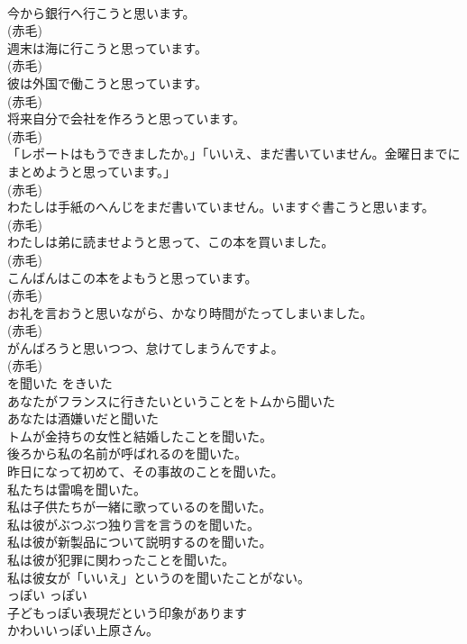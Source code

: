 \documentclass[8pt]{extreport}
\begin{document}
\begin{CJK}{UTF8}{min}
\\	今から銀行へ行こうと思います。  
\\	(赤毛)
\\	週末は海に行こうと思っています。  
\\	(赤毛)
\\	彼は外国で働こうと思っています。  
\\	(赤毛)
\\	将来自分で会社を作ろうと思っています。  
\\	(赤毛)
\\	「レポートはもうできましたか。」「いいえ、まだ書いていません。金曜日までにまとめようと思っています。」  
\\	(赤毛)
\\	わたしは手紙のへんじをまだ書いていません。いますぐ書こうと思います。  
\\	(赤毛)
\\	わたしは弟に読ませようと思って、この本を買いました。  
\\	(赤毛)
\\	こんばんはこの本をよもうと思っています。  
\\	(赤毛)
\\	お礼を言おうと思いながら、かなり時間がたってしまいました。  
\\	(赤毛)
\\	がんばろうと思いつつ、怠けてしまうんですよ。  
\\	(赤毛)
\\	を聞いた	をきいた	
\\	あなたがフランスに行きたいということをトムから聞いた  
\\	あなたは酒嫌いだと聞いた  
\\	トムが金持ちの女性と結婚したことを聞いた。  
\\	後ろから私の名前が呼ばれるのを聞いた。  
\\	昨日になって初めて、その事故のことを聞いた。  
\\	私たちは雷鳴を聞いた。  
\\	私は子供たちが一緒に歌っているのを聞いた。  
\\	私は彼がぶつぶつ独り言を言うのを聞いた。  
\\	私は彼が新製品について説明するのを聞いた。  
\\	私は彼が犯罪に関わったことを聞いた。  
\\	私は彼女が「いいえ」というのを聞いたことがない。  
\\	っぽい	っぽい	
\\	子どもっぽい表現だという印象があります  
\\	かわいいっぽい上原さん。   

\end{CJK}
\end{document}
